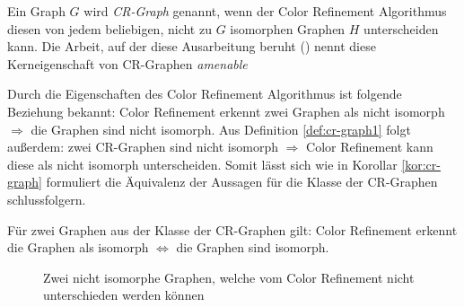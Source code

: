 \begin{Definition}
	Ein Graph $G$ wird \emph{CR-Graph} genannt, wenn der Color Refinement Algorithmus diesen von jedem beliebigen, nicht zu $G$ isomorphen Graphen $H$ unterscheiden kann.
	Die Arbeit, auf der diese Ausarbeitung beruht (\cite{Arvind2015}) nennt diese Kerneigenschaft von CR-Graphen \emph{amenable}
	\label{def:cr-graph1}
\end{Definition}

Durch die Eigenschaften des Color Refinement Algorithmus ist folgende Beziehung bekannt: Color Refinement erkennt zwei Graphen als nicht isomorph $\Rightarrow$ die Graphen sind nicht isomorph.
Aus Definition \ref{def:cr-graph1} folgt außerdem: zwei CR-Graphen sind nicht isomorph $\Rightarrow$ Color Refinement kann diese als nicht isomorph unterscheiden.
Somit lässt sich wie in Korollar \ref{kor:cr-graph} formuliert die Äquivalenz der Aussagen für die Klasse der CR-Graphen schlussfolgern.

\begin{Korollar}
	Für zwei Graphen aus der Klasse der CR-Graphen gilt: Color Refinement erkennt die Graphen als isomorph $\Leftrightarrow$ die Graphen sind isomorph.
	\label{kor:cr-graph}
\end{Korollar}

\begin{figure}[t]
	\centering
	\caption{Zwei nicht isomorphe Graphen, welche vom Color Refinement nicht unterschieden werden können}
	\label{fig:nicht_isomorphe_graphen}
\end{figure}

